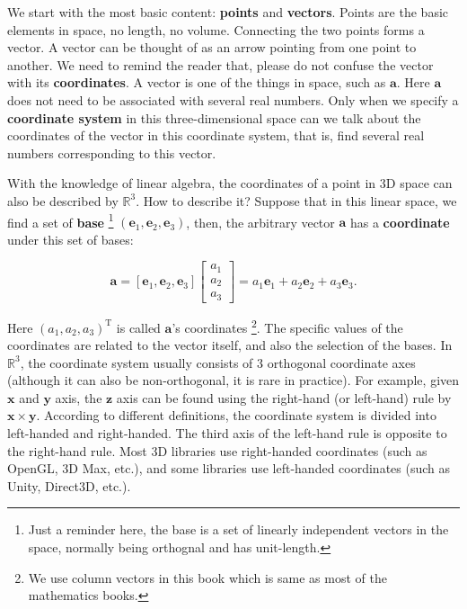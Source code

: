 We start with the most basic content: \textbf{points} and \textbf{vectors}. Points are the basic elements in space, no length, no volume. Connecting the two points forms a vector. A vector can be thought of as an arrow pointing from one point to another. We need to remind the reader that, please do not confuse the vector with its \textbf{coordinates}. A vector is one of the things in space, such as $ \mathbf{a}$. Here $ \mathbf{a} $ does not need to be associated with several real numbers. Only when we specify a \textbf{coordinate system} in this three-dimensional space can we talk about the coordinates of the vector in this coordinate system, that is, find several real numbers corresponding to this vector.

With the knowledge of linear algebra, the coordinates of a point in 3D space can also be described by $ \mathbb{R}^3$. How to describe it? Suppose that in this linear space, we find a set of \textbf{base} \footnote{Just a reminder here, the base is a set of linearly independent vectors in the space, normally being orthognal and has unit-length.} $ (\mathbf{e}_1,\mathbf{e}_2,\mathbf{e}_3) $, then, the arbitrary vector $ \mathbf{a} $ has a \textbf{coordinate} under this set of bases:

\begin{equation}
\mathbf{a} = \left[ {{\mathbf{e}_1},{\mathbf{e}_2},{\mathbf{e}_3}} \right]\left[ \begin{array}{l}
{a_1}\\
{a_2}\\
{a_3}
\end{array} \right] = {a_1}{\mathbf{e}_1} + {a_2}{\mathbf{e}_2} + {a_3}{\mathbf{e}_3}.
\end{equation}

Here $ (a_ 1, a_ 2, a_ 3 )^ \mathrm {T} $ is called $\mathbf {a}$'s coordinates \footnote {We use column vectors in this book which is same as most of the  mathematics books.}. The specific values of the coordinates are related to the vector itself, and also the selection of the bases. In $\mathbb{R}^3$, the coordinate system usually consists of 3 orthogonal coordinate axes (although it can also be non-orthogonal, it is rare in practice). For example, given $ \mathbf {x} $ and $ \mathbf {y} $ axis, the $ \mathbf {z} $ axis can be found using the right-hand (or left-hand) rule by $ \mathbf {x} \times  \mathbf {y} $. According to different definitions, the coordinate system is divided into left-handed and right-handed. The third axis of the left-hand rule is opposite to the right-hand rule. Most 3D libraries use right-handed coordinates (such as OpenGL, 3D Max, etc.), and some libraries use left-handed coordinates (such as Unity, Direct3D, etc.).

